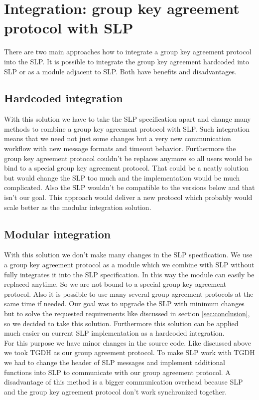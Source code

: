 \section{Integration: group key agreement protocol with SLP}
There are two main approaches how to integrate a group key agreement protocol into the SLP. It is possible to integrate the group key agreement hardcoded into SLP or as a module adjacent to SLP. Both have benefits and disadvantages. 

\subsection{Hardcoded integration}
With this solution we have to take the SLP specification apart and change many methods to combine a group key agreement protocol with SLP. Such integration means that we need not just some changes but a very new communication workflow with new message formats and timeout behavior. Furthermore the group key agreement protocol couldn't be replaces anymore so all users would be bind to a special group key agreement protocol. That could be a neatly solution but would change the SLP too much and the implementation would be much complicated. Also the SLP wouldn't be compatible to the versions below and that isn't our goal. This approach would deliver a new protocol which probably would scale better as the modular integration solution.

\subsection{Modular integration}
With this solution we don't make many changes in the SLP specification. We use a group key agreement protocol as a module which we combine with SLP without fully integrates it into the SLP specification. In this way the module can easily be replaced anytime. So we are not bound to a special group key agreement protocol. Also it is possible to use many several group agreement protocols at the same time if needed. Our goal was to upgrade the SLP with minimum changes but to solve the requested requirements like discussed in section \ref{sec:conclusion}, so we decided to take this solution. Furthermore this solution can be applied much easier on current SLP implementation as a hardcoded integration.\\
For this purpose we have minor changes in the source code. Like discussed above we took TGDH as our group agreement protocol. To make SLP work with TGDH we had to change the header of SLP messages and implement additional functions into SLP to communicate with our group agreement protocol. A disadvantage of this method is a bigger communication overhead because SLP and the group key agreement protocol don't work synchronized together.